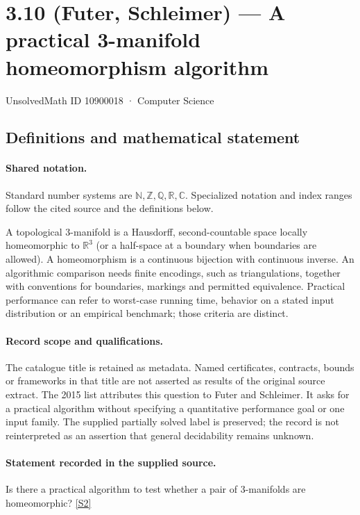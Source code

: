 \documentclass[11pt]{article}
\newcommand{\sref}[2]{\hyperlink{source:#1:#2}{[S#2]}}
\begin{document}
\setcounter{section}{10900017}
\section{3.10 (Futer, Schleimer) — A practical 3-manifold homeomorphism algorithm}\label{10900018}
{\small\sffamily UnsolvedMath ID 10900018 · Computer Science}
\subsection{Definitions and mathematical statement}

\paragraph{Shared notation.}Standard number systems are $\mathbb N,\mathbb Z,\mathbb Q,\mathbb R,\mathbb C$. Specialized notation and index ranges follow the cited source and the definitions below.


A topological $3$-manifold is a Hausdorff, second-countable space locally homeomorphic to $\mathbb R^3$ (or a half-space at a boundary when boundaries are allowed). A homeomorphism is a continuous bijection with continuous inverse. An algorithmic comparison needs finite encodings, such as triangulations, together with conventions for boundaries, markings and permitted equivalence. Practical performance can refer to worst-case running time, behavior on a stated input distribution or an empirical benchmark; those criteria are distinct.
\paragraph{Record scope and qualifications.}
The catalogue title is retained as metadata. Named certificates, contracts, bounds or frameworks in that title are not asserted as results of the original source extract.
The 2015 list attributes this question to Futer and Schleimer. It asks for a practical algorithm without specifying a quantitative performance goal or one input family. The supplied partially solved label is preserved; the record is not reinterpreted as an assertion that general decidability remains unknown.
\paragraph{Statement recorded in the supplied source.}
Is there a practical algorithm to test whether a pair of $3$-manifolds are homeomorphic? \sref{10900018}{2}
\end{document}
